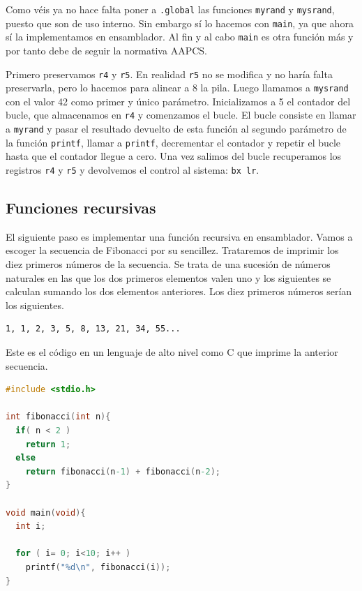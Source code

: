 Como véis ya no hace falta poner a {\tt .global} las funciones {\tt myrand} y {\tt mysrand},
puesto que son de uso interno. Sin embargo sí lo hacemos con {\tt main}, ya que ahora sí
la implementamos en ensamblador. Al fin y al cabo {\tt main} es otra función más y por
tanto debe de seguir la normativa AAPCS.

Primero preservamos {\tt r4} y {\tt r5}. En realidad {\tt r5} no se modifica y no haría falta
preservarla, pero lo hacemos para alinear a 8 la pila. Luego llamamos a {\tt mysrand} con el valor 42
como primer y único parámetro. Inicializamos a 5 el contador del bucle, que almacenamos en
{\tt r4} y comenzamos el bucle. El bucle consiste en llamar a {\tt myrand} y pasar el resultado
devuelto de esta función al segundo parámetro de la función {\tt printf}, llamar a {\tt printf},
decrementar el contador y repetir el bucle hasta que el contador llegue a cero. Una vez salimos
del bucle recuperamos los registros {\tt r4} y {\tt r5} y devolvemos el control
al sistema: {\tt bx lr}.

\subsection{Funciones recursivas}

El siguiente paso es implementar una función recursiva en ensamblador. Vamos a escoger la 
secuencia de Fibonacci por su sencillez. Trataremos de imprimir los diez primeros números
de la secuencia. Se trata de una sucesión de números naturales en las que los dos primeros
elementos valen uno y los siguientes se calculan sumando los dos elementos anteriores.
Los diez primeros números serían los siguientes.

\begin{lstlisting}
1, 1, 2, 3, 5, 8, 13, 21, 34, 55...
\end{lstlisting}

Este es el código en un lenguaje de alto nivel como C que imprime la anterior secuencia.

\begin{lstlisting}[caption={Código del programa subrut3.c},label={lst:codigoPract3_4},language=C]
#include <stdio.h>

int fibonacci(int n){
  if( n < 2 )
    return 1;
  else
    return fibonacci(n-1) + fibonacci(n-2);
}

void main(void){
  int i;

  for ( i= 0; i<10; i++ )
    printf("%d\n", fibonacci(i));
}
\end{lstlisting}

